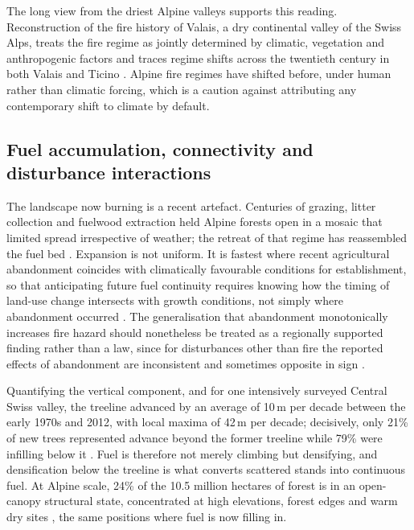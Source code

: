 \documentclass[11pt,a4paper]{article}
\begin{document}
The long view from the driest Alpine valleys supports this reading. Reconstruction of the fire history of Valais, a dry continental valley of the Swiss Alps, treats the fire regime as jointly determined by climatic, vegetation and anthropogenic factors and traces regime shifts across the twentieth century in both Valais and Ticino \citep{zumbrunnen_reconstructing_2010}. Alpine fire regimes have shifted before, under human rather than climatic forcing, which is a caution against attributing any contemporary shift to climate by default.

\subsection{Fuel accumulation, connectivity and disturbance interactions}

The landscape now burning is a recent artefact. Centuries of grazing, litter collection and fuelwood extraction held Alpine forests open in a mosaic that limited spread irrespective of weather; the retreat of that regime has reassembled the fuel bed \citep{bebi_changes_2017}. Expansion is not uniform. It is fastest where recent agricultural abandonment coincides with climatically favourable conditions for establishment, so that anticipating future fuel continuity requires knowing how the timing of land-use change intersects with growth conditions, not simply where abandonment occurred \citep{garbarino_contrasting_2020}. The generalisation that abandonment monotonically increases fire hazard should nonetheless be treated as a regionally supported finding rather than a law, since for disturbances other than fire the reported effects of abandonment are inconsistent and sometimes opposite in sign \citep{mantero_influence_2020}.

Quantifying the vertical component, and for one intensively surveyed Central Swiss valley, the treeline advanced by an average of 10\,m per decade between the early 1970s and 2012, with local maxima of 42\,m per decade; decisively, only 21\% of new trees represented advance beyond the former treeline while 79\% were infilling below it \citep{frei_evidence_2023}. Fuel is therefore not merely climbing but densifying, and densification below the treeline is what converts scattered stands into continuous fuel. At Alpine scale, 24\% of the 10.5 million hectares of forest is in an open-canopy structural state, concentrated at high elevations, forest edges and warm dry sites \citep{stritih_alternative_2023}, the same positions where fuel is now filling in.
\end{document}
